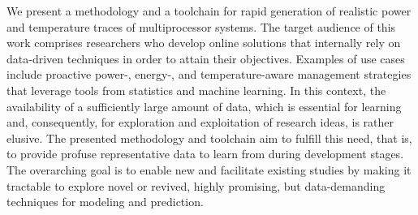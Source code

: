 We present a methodology and a toolchain for rapid generation of realistic power
and temperature traces of multiprocessor systems. The target audience of this
work comprises researchers who develop online solutions that internally rely on
data-driven techniques in order to attain their objectives. Examples of use
cases include proactive power-, \mbox{energy-,} and temperature-aware management
strategies that leverage tools from statistics and machine learning. In this
context, the availability of a sufficiently large amount of data, which is
essential for learning and, consequently, for exploration and exploitation of
research ideas, is rather elusive. The presented methodology and toolchain aim
to fulfill this need, that is, to provide profuse representative data to learn
from during development stages. The overarching goal is to enable new and
facilitate existing studies by making it tractable to explore novel or revived,
highly promising, but data-demanding techniques for modeling and prediction.
